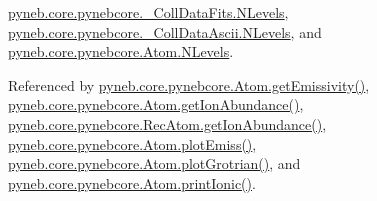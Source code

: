 \hyperlink{pynebcore_8py_source_l00637}{pyneb.\+core.\+pynebcore.\+\_\+\+Coll\+Data\+Fits.\+N\+Levels}, \hyperlink{pynebcore_8py_source_l00984}{pyneb.\+core.\+pynebcore.\+\_\+\+Coll\+Data\+Ascii.\+N\+Levels}, and \hyperlink{pynebcore_8py_source_l01260}{pyneb.\+core.\+pynebcore.\+Atom.\+N\+Levels}.



Referenced by \hyperlink{pynebcore_8py_source_l01716}{pyneb.\+core.\+pynebcore.\+Atom.\+get\+Emissivity()}, \hyperlink{pynebcore_8py_source_l02110}{pyneb.\+core.\+pynebcore.\+Atom.\+get\+Ion\+Abundance()}, \hyperlink{pynebcore_8py_source_l02961}{pyneb.\+core.\+pynebcore.\+Rec\+Atom.\+get\+Ion\+Abundance()}, \hyperlink{pynebcore_8py_source_l02313}{pyneb.\+core.\+pynebcore.\+Atom.\+plot\+Emiss()}, \hyperlink{pynebcore_8py_source_l02372}{pyneb.\+core.\+pynebcore.\+Atom.\+plot\+Grotrian()}, and \hyperlink{pynebcore_8py_source_l02167}{pyneb.\+core.\+pynebcore.\+Atom.\+print\+Ionic()}.


